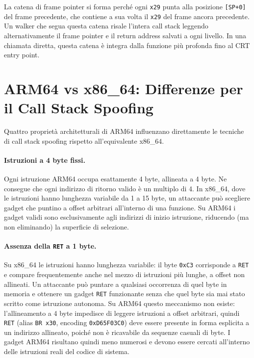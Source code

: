 La catena di frame pointer si forma perché ogni \texttt{x29} punta alla
posizione \texttt{[SP+0]} del frame precedente, che contiene a sua volta il
\texttt{x29} del frame ancora precedente. Un walker che segua questa catena
risale l'intera call stack leggendo alternativamente il frame pointer e il
return address salvati a ogni livello. In una chiamata diretta, questa catena
è integra dalla funzione più profonda fino al CRT entry point.


\section{ARM64 vs x86\_64: Differenze per il Call Stack Spoofing}

Quattro proprietà architetturali di ARM64 influenzano direttamente le tecniche
di call stack spoofing rispetto all'equivalente x86\_64.

\paragraph{Istruzioni a 4 byte fissi.}
Ogni istruzione ARM64 occupa esattamente 4 byte, allineata a 4 byte. Ne consegue
che ogni indirizzo di ritorno valido è un multiplo di 4. In x86\_64, dove le
istruzioni hanno lunghezza variabile da 1 a 15 byte, un attaccante può scegliere
gadget che puntino a offset arbitrari all'interno di una funzione. Su ARM64 i
gadget validi sono esclusivamente agli indirizzi di inizio istruzione, riducendo
(ma non eliminando) la superficie di selezione.

\paragraph{Assenza della \texttt{RET} a 1 byte.}
Su x86\_64 le istruzioni hanno lunghezza variabile: il byte \texttt{0xC3}
corrisponde a \texttt{RET} e compare frequentemente anche nel mezzo di
istruzioni più lunghe, a offset non allineati. Un attaccante può puntare a
qualsiasi occorrenza di quel byte in memoria e ottenere un gadget \texttt{RET}
funzionante senza che quel byte sia mai stato scritto come istruzione autonoma.
Su ARM64 questo meccanismo non esiste: l'allineamento a 4 byte impedisce di
leggere istruzioni a offset arbitrari, quindi \texttt{RET} (alias
\texttt{BR x30}, encoding \texttt{0xD65F03C0}) deve essere presente in forma 
esplicita a un indirizzo allineato, poiché non è ricavabile da sequenze casuali di byte. I gadget 
ARM64 risultano quindi meno numerosi e devono essere cercati all'interno delle istruzioni 
reali del codice di sistema.

